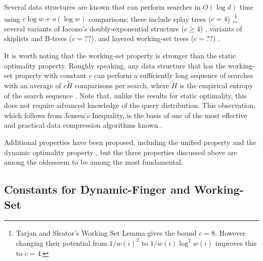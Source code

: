 \documentclass{patmorin}
\begin{document}
\begin{description}
    Several data structures are known that can perform searches in
    $O(\log d)$ time using $c\log w+o(\log w)$ comparisons; these include
    splay trees ($c=4$) \cite{X},\footnote{Tarjan and Sleator's Working
    Set Lemma \cite{X} gives the bound $c=8$.  However changing their
    potential from $1/w(i)^2$ to $1/w(i)\log^2 w(i)$ improves this to
    $c=4$.} several variants of Iacono's doubly-exponential structure
    ($c\ge 4$) \cite{X}, variants of skiplists and B-trees ($c=??$),
    and layered working-set trees ($c=??$) \cite{hXX}.

    It is worth noting that the working-set property is stronger than the
    static optimality property.  Roughly speaking, any data structure
    that has the working-set property with constant $c$ can perform a
    sufficiently long sequence of searches with an average of $c\tilde{H}$
    comparisons per search, where $\tilde{H}$ is the empirical entropy of
    the search sequence \cite{X,Y}.  Note that, unlike the results for
    static optimality, this does not require advanced knowledge of the
    query distribution.  This observation, which follows from Jensen's
    Inequality, is the basis of one of the most effective and practical
    data compression algorithms known \cite{mtf-compression,bzip}.

\end{description}
Additional properties have been proposed, including the unified property
\cite{IXX} and the dynamic optimality property \cite{X}, but the three
properties discussed above are among the oldesseem to be among the most fundamental.


\subsection{Constants for Dynamic-Finger and Working-Set}
\end{document}
